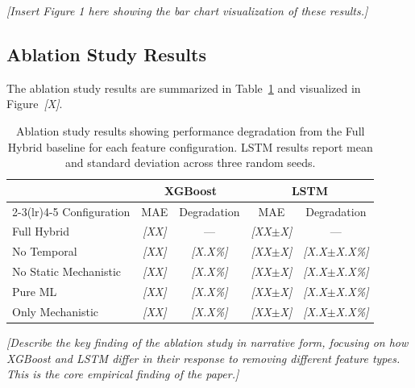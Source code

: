 \documentclass[11pt,a4paper]{article}
\newcommand{\placeholder}[1]{\textcolor{placeholdergray}{\textit{[#1]}}}
\begin{document}
\placeholder{Insert Figure 1 here showing the bar chart visualization
of these results.}

\subsection{Ablation Study Results}

The ablation study results are summarized in Table~\ref{tab:ablation}
and visualized in Figure~\placeholder{X}.

\begin{table}[H]
\centering
\caption{Ablation study results showing performance degradation from
the Full Hybrid baseline for each feature configuration. LSTM results
report mean and standard deviation across three random seeds.}
\label{tab:ablation}
\begin{tabular}{lcccc}
\toprule
& \multicolumn{2}{c}{XGBoost} & \multicolumn{2}{c}{LSTM} \\
\cmidrule(lr){2-3}\cmidrule(lr){4-5}
Configuration & MAE & Degradation & MAE & Degradation \\
\midrule
Full Hybrid & \placeholder{XX} & --- & \placeholder{XX$\pm$X} & --- \\
No Temporal & \placeholder{XX} & \placeholder{X.X\%} & \placeholder{XX$\pm$X} & \placeholder{X.X$\pm$X.X\%} \\
No Static Mechanistic & \placeholder{XX} & \placeholder{X.X\%} & \placeholder{XX$\pm$X} & \placeholder{X.X$\pm$X.X\%} \\
Pure ML & \placeholder{XX} & \placeholder{X.X\%} & \placeholder{XX$\pm$X} & \placeholder{X.X$\pm$X.X\%} \\
Only Mechanistic & \placeholder{XX} & \placeholder{X.X\%} & \placeholder{XX$\pm$X} & \placeholder{X.X$\pm$X.X\%} \\
\bottomrule
\end{tabular}
\end{table}

\placeholder{Describe the key finding of the ablation study in narrative
form, focusing on how XGBoost and LSTM differ in their response to
removing different feature types. This is the core empirical finding
of the paper.}

%
\end{document}
